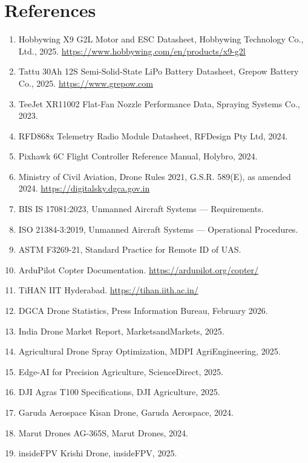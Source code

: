 \documentclass[12pt,a4paper]{article}
\begin{document}
\section*{References}
\begin{enumerate}
    \item Hobbywing X9 G2L Motor and ESC Datasheet, Hobbywing Technology Co., Ltd., 2025. \url{https://www.hobbywing.com/en/products/x9-g2l}
    \item Tattu 30Ah 12S Semi-Solid-State LiPo Battery Datasheet, Grepow Battery Co., 2025. \url{https://www.grepow.com}
    \item TeeJet XR11002 Flat-Fan Nozzle Performance Data, Spraying Systems Co., 2023.
    \item RFD868x Telemetry Radio Module Datasheet, RFDesign Pty Ltd, 2024.
    \item Pixhawk 6C Flight Controller Reference Manual, Holybro, 2024.
    \item Ministry of Civil Aviation, Drone Rules 2021, G.S.R. 589(E), as amended 2024. \url{https://digitalsky.dgca.gov.in}
    \item BIS IS 17081:2023, Unmanned Aircraft Systems — Requirements.
    \item ISO 21384-3:2019, Unmanned Aircraft Systems — Operational Procedures.
    \item ASTM F3269-21, Standard Practice for Remote ID of UAS.
    \item ArduPilot Copter Documentation. \url{https://ardupilot.org/copter/}
    \item TiHAN IIT Hyderabad. \url{https://tihan.iith.ac.in/}
    \item DGCA Drone Statistics, Press Information Bureau, February 2026.
    \item India Drone Market Report, MarketsandMarkets, 2025.
    \item Agricultural Drone Spray Optimization, MDPI AgriEngineering, 2025.
    \item Edge-AI for Precision Agriculture, ScienceDirect, 2025.
    \item DJI Agras T100 Specifications, DJI Agriculture, 2025.
    \item Garuda Aerospace Kisan Drone, Garuda Aerospace, 2024.
    \item Marut Drones AG-365S, Marut Drones, 2024.
    \item insideFPV Krishi Drone, insideFPV, 2025.

\end{enumerate}
\end{document}
